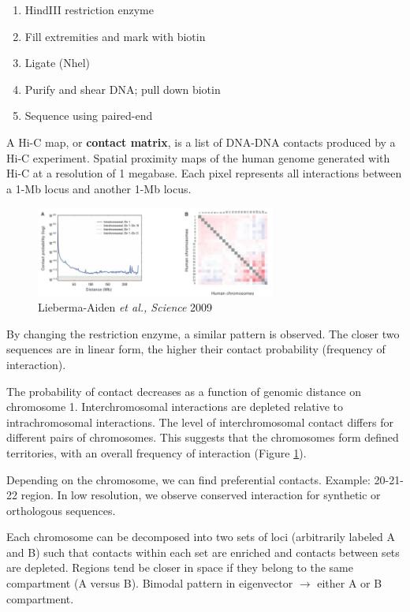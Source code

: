\begin{enumerate}
\def\labelenumi{\arabic{enumi}.}
\tightlist
\item
  HindIII restriction enzyme
\item
  Fill extremities and mark with biotin
\item
  Ligate (Nhel)
\item
  Purify and shear DNA; pull down biotin
\item
  Sequence using paired-end
\end{enumerate}

A Hi-C map, or \textbf{contact matrix}, is a list of DNA-DNA contacts produced by a Hi-C experiment. Spatial proximity maps of the human genome generated with Hi-C at a resolution of 1 megabase. Each pixel represents all interactions between a 1-Mb locus and another 1-Mb locus.

\begin{figure}
\centering
\includegraphics[width=0.7\textwidth]{../_resources/Screenshot_2022-10-25_at_11-47-30.png}
\caption{Lieberma-Aiden \emph{et al., Science} 2009}
\label{fig:int}
\end{figure}

By changing the restriction enzyme, a similar pattern is observed. The closer two sequences are in linear form, the higher their contact probability (frequency of interaction).

The probability of contact decreases as a function of genomic distance on chromosome 1. Interchromosomal interactions are depleted relative to intrachromosomal interactions. The level of interchromosomal contact differs for different pairs of chromosomes. This suggests that the chromosomes form defined territories, with an overall frequency of interaction (Figure \ref{fig:int}).

Depending on the chromosome, we can find preferential contacts. Example: 20-21-22 region. In low resolution, we observe conserved interaction for synthetic or orthologous sequences.

Each chromosome can be decomposed into two sets of loci (arbitrarily labeled A and B) such that contacts within each set are enriched and contacts between sets are depleted. Regions tend be closer in space if they belong to the same compartment (A versus B). Bimodal pattern in eigenvector $\rightarrow$ either A or B compartment.

